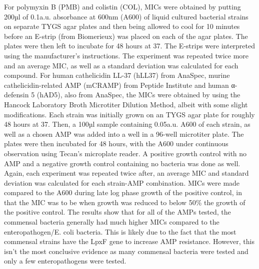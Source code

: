 For polymyxin B (PMB) and colistin (COL), MICs were obtained by putting 200µl of 0.1a.u. absorbance at 600nm (A600) of liquid cultured bacterial strains on separate TYGS agar plates and then being allowed to cool for 10 minutes before an E-strip (from Biomerieux) was placed on each of the agar plates. The plates were then left to incubate for 48 hours at 37. The E-strips were interpreted using the manufacturer’s instructions. The experiment was repeated twice more and an average MIC, as well as a standard deviation was calculated for each compound.
For human cathelicidin LL-37 (hLL37) from AnaSpec, murine cathelicidin-related AMP (mCRAMP) from Peptide Institute and human α-defensin 5 (hAD5), also from AnaSpec, the MICs were obtained by using the Hancock Laboratory Broth Microtiter Dilution Method, albeit with some slight modifications. Each strain was initially grown on an TYGS agar plate for roughly 48 hours at 37. Then, a 100µl sample containing 0.05a.u. A600 of each strain, as well as a chosen AMP was added into a well in a 96-well microtiter plate. The plates were then incubated for 48 hours, with the A600 under continuous observation using Tecan’s microplate reader. A positive growth control with no AMP and a negative growth control containing no bacteria was done as well. Again, each experiment was repeated twice after, an average MIC and standard deviation was calculated for each strain-AMP combination. MICs were made compared to the A600 during late log phase growth of the positive control, in that the MIC was to be when growth was reduced to below 50\% the growth of the positive control.
The results show that for all of the AMPs tested, the commensal bacteria generally had much higher MICs compared to the enteropathogen/E. coli bacteria. This is likely due to the fact that the most commensal strains have the LpxF gene to increase AMP resistance. However, this isn’t the most conclusive evidence as many commensal bacteria were tested and only a few enteropathogens were tested.

